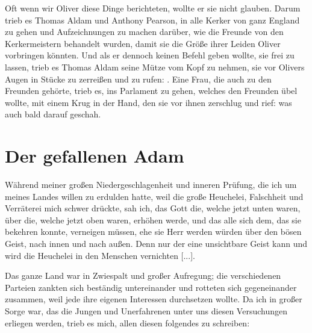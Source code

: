 Oft wenn wir Oliver diese 
Dinge berichteten, wollte er sie nicht
glauben. Darum trieb es Thomas Aldam 
und Anthony Pearson,
in alle Kerker von ganz England zu gehen und Aufzeichnungen
zu machen darüber, wie die Freunde von den Kerkermeistern
behandelt wurden, damit sie die Größe ihrer Leiden Oliver 
vorbringen könnten. Und als er dennoch keinen Befehl geben wollte,
sie frei zu lassen, trieb es Thomas Aldam seine Mütze vom Kopf
zu nehmen, sie vor Olivers Augen in Stücke zu zerreißen und zu
rufen: . Eine Frau, die auch zu den Freunden 
gehörte, trieb es, ins Parlament zu gehen, welches den Freunden
übel wollte, mit einem Krug in der Hand, den sie vor ihnen 
zerschlug und rief:  was auch bald darauf geschah. 

\section{Der gefallenen Adam}

Während meiner großen 
Niedergeschlagenheit 
und inneren Prüfung, die ich um meines Landes willen
zu erdulden hatte, weil die große Heuchelei, Falschheit und 
Verräterei mich schwer drückte, sah ich, das Gott die, welche jetzt
unten waren, über die, welche jetzt oben waren, erhöhen werde,
und das alle sich dem, das sie bekehren konnte, verneigen müssen,
ehe sie Herr werden würden über den bösen Geist, nach innen
und nach außen. Denn nur der eine unsichtbare Geist kann und
wird die Heuchelei in den Menschen vernichten [...].


Das ganze Land war in Zwiespalt und großer Aufregung;
die verschiedenen Parteien zankten sich beständig untereinander
und rotteten sich gegeneinander zusammen, weil jede ihre eigenen
Interessen durchsetzen wollte. Da ich in großer Sorge war, das
die Jungen und Unerfahrenen unter uns diesen Versuchungen 
erliegen werden, trieb es mich, allen diesen folgendes zu schreiben:

